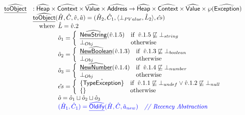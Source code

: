 \documentclass{article}
\newcommand{\SF}[1]{\mbox{\textsf{#1}}}
\newcommand{\comment}[1]{\textit{#1}}
\newcommand{\wherec}[1]{{\rm where}\begin{array}[t]{l}#1\end{array}}
\newcommand{\ifc}[1]{{\rm if}\begin{array}[t]{l}#1\end{array}}
\newcommand{\owc}{{\rm otherwise}}
\newcommand{\Loc}{\SF{Loc}}
\newcommand{\abs}[1]{\widehat{\SF{#1}}}
\newcommand{\aHeap}{\abs{Heap}}
\newcommand{\aValue}{\abs{Value}}
\newcommand{\powerset}[1]{\wp(#1)}
\newcommand{\hf}[1]{\underline{\sf #1}}
\newcommand{\ahf}[1]{\widehat{\underline{\sf #1}}}
\def\inblue{\color{blue}}
\begin{document}
\[
\begin{array}{ll}
\ahf{toObject} & : \aHeap \times \abs{Context} \times \aValue \times \abs{Address} \rightarrow \aHeap \times \abs{Context} \times \aValue \times \powerset{\abs{Exception}} \\
& \ahf{toObject}(\hat{H}, \hat{C}, \hat{v}, \hat{a})
  = (\hat{H}_2,\hat{C}_1,\langle\bot_{PValue},\hat{L}_2\rangle,\hat{es}) \\
  & \quad\wherec{
    \hat{L} = \hat{v}.2\\
    \hat{o}_1 =
    \left\{
      \begin{array}{ll}
        \ahf{NewString}(\hat{v}.1.5) & \ifc{\hat{v}.1.5\not\sqsubseteq\bot_{string}} \\
        \bot_{Obj} & \owc\\
      \end{array}
    \right.\\
    \hat{o}_2 =
    \left\{
      \begin{array}{ll}
        \ahf{NewBoolean}(\hat{v}.1.3) & \ifc{\hat{v}.1.3\not\sqsubseteq\bot_{boolean}} \\
        \bot_{Obj} & \owc\\
      \end{array}
    \right.\\
    \hat{o}_3 =
    \left\{
      \begin{array}{ll}
        \ahf{NewNumber}(\hat{v}.1.4) & \ifc{\hat{v}.1.4\not\sqsubseteq\bot_{number}} \\
        \bot_{Obj} & \owc\\
      \end{array}
    \right.\\
    \hat{es} = 
    \left\{
      \begin{array}{ll}
        \{\hat{\SF{TypeException}}\} & \ifc{\hat{v}.1.1\not\sqsubseteq\bot_{undef}\lor \hat{v}.1.2\not\sqsubseteq\bot_{null}} \\
        \{\} & \owc\\
      \end{array}
    \right.\\
    \hat{o} = \hat{o}_1 \sqcup \hat{o}_2 \sqcup \hat{o}_3 \\
   \inblue (\hat{H}_1, \hat{C}_1) = \ahf{Oldify}(\hat{H}, \hat{C}, \hat{a}_{new})
   \quad\comment{{\inblue // Recency Abstraction}}\\
}
\end{array}\]
\end{document}
